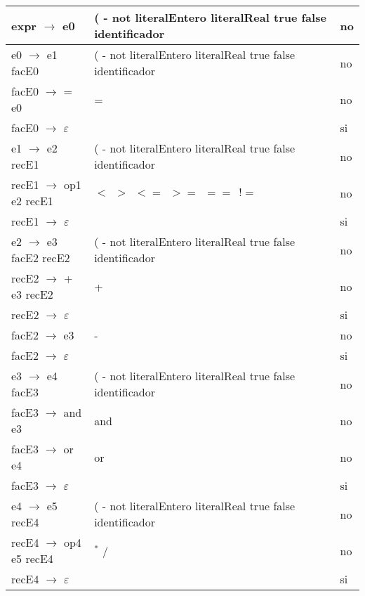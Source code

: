 \documentclass[11pt]{article}
\begin{document}
\begin{longtable}{|p{6cm}|p{4cm}|p{3cm}|}
                expr $\rightarrow$ e0 & ( - not literalEntero literalReal true false identificador & no \\
                \hline
                e0 $\rightarrow$ e1 facE0 & ( - not literalEntero literalReal true false identificador & no \\
                \hline
                facE0 $\rightarrow$ = e0 & = & no \\
                \hline
                facE0 $\rightarrow$ $\varepsilon$ &  & si \\
                \hline
                e1 $\rightarrow$ e2 recE1 & ( - not literalEntero literalReal true false identificador & no \\
                \hline
                recE1 $\rightarrow$ op1 e2 recE1 & $< \ \ > \ \ <= \ \ >= \ \ == \ \  !=$ & no \\
                \hline
                recE1 $\rightarrow$ $\varepsilon$ &  & si \\
                \hline
                e2 $\rightarrow$ e3 facE2 recE2 & ( - not literalEntero literalReal true false identificador & no \\
                \hline
                recE2 $\rightarrow$ + e3 recE2 & + & no \\
                \hline
                recE2 $\rightarrow$ $\varepsilon$ &  & si \\
                \hline
                facE2  $\rightarrow$ e3 & - & no \\
                \hline
                facE2  $\rightarrow$ $\varepsilon$ &  & si \\
                \hline
                e3 $\rightarrow$ e4 facE3 & ( - not literalEntero literalReal true false identificador & no \\
                \hline
                facE3 $\rightarrow$ and e3 & and & no \\
                \hline
                facE3 $\rightarrow$ or e4 & or & no \\
                \hline
                facE3 $\rightarrow$ $\varepsilon$ &  & si \\
                \hline
                e4 $\rightarrow$ e5 recE4 & ( - not literalEntero literalReal true false identificador & no \\
                \hline
                recE4 $\rightarrow$ op4 e5 recE4 & $^{\ast}$ / & no \\
                \hline
                recE4 $\rightarrow$ $\varepsilon$ &  & si \\

\end{longtable}
\end{document}
